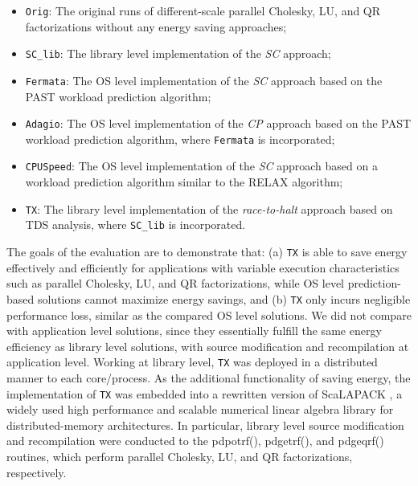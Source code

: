 \documentclass[12pt]{elsarticle}
\begin{document}
\begin{itemize}
\item \texttt{Orig}: The original runs of different-scale parallel Cholesky, LU, and QR factorizations without any energy saving approaches;
\item \texttt{SC\_lib}: The library level implementation of the \emph{SC} approach;
\item \texttt{Fermata}: The OS level implementation of the \emph{SC} approach based on the PAST workload prediction algorithm;
\item \texttt{Adagio}: The OS level implementation of the \emph{CP} approach based on the PAST workload prediction algorithm, where \texttt{Fermata} is incorporated;
\item \texttt{CPUSpeed}: The OS level implementation of the \emph{SC} approach based on a workload prediction algorithm similar to the RELAX algorithm;
\item \texttt{TX}: The library level implementation of the \emph{race-to-halt} approach based on TDS analysis, where \texttt{SC\_lib} is incorporated.\end{itemize}

The goals of the evaluation are to demonstrate that: (a) \texttt{TX} is able to save energy effectively and efficiently for applications with variable execution characteristics such as parallel Cholesky, LU, and QR factorizations, while OS level prediction-based solutions cannot maximize energy savings, and (b) \texttt{TX} only incurs negligible performance loss, similar as the compared OS level solutions. We did not compare with application level solutions, since they essentially fulfill the same energy efficiency as library level solutions, with source modification and recompilation at application level. Working at library level, \texttt{TX} was deployed in a distributed manner to each core/process. As the additional functionality of saving energy, the implementation of \texttt{TX} was embedded into a rewritten version of ScaLAPACK \cite{scalapack}, a widely used high performance and scalable numerical linear algebra library for distributed-memory architectures. In particular, library level source modification and recompilation were conducted to the \textsf{pdpotrf()}, \textsf{pdgetrf()}, and \textsf{pdgeqrf()} routines, which perform parallel Cholesky, LU, and QR factorizations, respectively.
\end{document}
